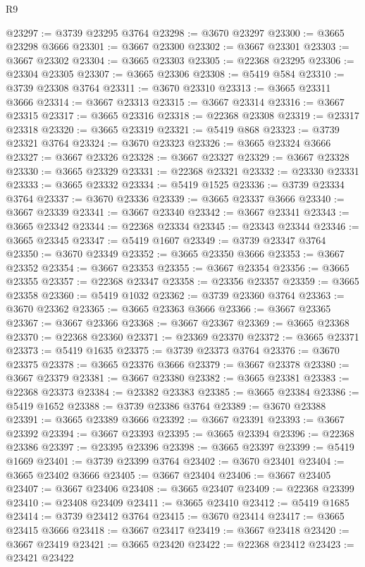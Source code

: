 \begin{lexlean}{R9}
\begin{coremodule}
@23297 := @3739 @23295 @3764
@23298 := @3670 @23297
@23300 := @3665 @23298 @3666
@23301 := @3667 @23300
@23302 := @3667 @23301
@23303 := @3667 @23302
@23304 := @3665 @23303
@23305 := @22368 @23295
@23306 := @23304 @23305
@23307 := @3665 @23306
@23308 := @5419 @584
@23310 := @3739 @23308 @3764
@23311 := @3670 @23310
@23313 := @3665 @23311 @3666
@23314 := @3667 @23313
@23315 := @3667 @23314
@23316 := @3667 @23315
@23317 := @3665 @23316
@23318 := @22368 @23308
@23319 := @23317 @23318
@23320 := @3665 @23319
@23321 := @5419 @868
@23323 := @3739 @23321 @3764
@23324 := @3670 @23323
@23326 := @3665 @23324 @3666
@23327 := @3667 @23326
@23328 := @3667 @23327
@23329 := @3667 @23328
@23330 := @3665 @23329
@23331 := @22368 @23321
@23332 := @23330 @23331
@23333 := @3665 @23332
@23334 := @5419 @1525
@23336 := @3739 @23334 @3764
@23337 := @3670 @23336
@23339 := @3665 @23337 @3666
@23340 := @3667 @23339
@23341 := @3667 @23340
@23342 := @3667 @23341
@23343 := @3665 @23342
@23344 := @22368 @23334
@23345 := @23343 @23344
@23346 := @3665 @23345
@23347 := @5419 @1607
@23349 := @3739 @23347 @3764
@23350 := @3670 @23349
@23352 := @3665 @23350 @3666
@23353 := @3667 @23352
@23354 := @3667 @23353
@23355 := @3667 @23354
@23356 := @3665 @23355
@23357 := @22368 @23347
@23358 := @23356 @23357
@23359 := @3665 @23358
@23360 := @5419 @1032
@23362 := @3739 @23360 @3764
@23363 := @3670 @23362
@23365 := @3665 @23363 @3666
@23366 := @3667 @23365
@23367 := @3667 @23366
@23368 := @3667 @23367
@23369 := @3665 @23368
@23370 := @22368 @23360
@23371 := @23369 @23370
@23372 := @3665 @23371
@23373 := @5419 @1635
@23375 := @3739 @23373 @3764
@23376 := @3670 @23375
@23378 := @3665 @23376 @3666
@23379 := @3667 @23378
@23380 := @3667 @23379
@23381 := @3667 @23380
@23382 := @3665 @23381
@23383 := @22368 @23373
@23384 := @23382 @23383
@23385 := @3665 @23384
@23386 := @5419 @1652
@23388 := @3739 @23386 @3764
@23389 := @3670 @23388
@23391 := @3665 @23389 @3666
@23392 := @3667 @23391
@23393 := @3667 @23392
@23394 := @3667 @23393
@23395 := @3665 @23394
@23396 := @22368 @23386
@23397 := @23395 @23396
@23398 := @3665 @23397
@23399 := @5419 @1669
@23401 := @3739 @23399 @3764
@23402 := @3670 @23401
@23404 := @3665 @23402 @3666
@23405 := @3667 @23404
@23406 := @3667 @23405
@23407 := @3667 @23406
@23408 := @3665 @23407
@23409 := @22368 @23399
@23410 := @23408 @23409
@23411 := @3665 @23410
@23412 := @5419 @1685
@23414 := @3739 @23412 @3764
@23415 := @3670 @23414
@23417 := @3665 @23415 @3666
@23418 := @3667 @23417
@23419 := @3667 @23418
@23420 := @3667 @23419
@23421 := @3665 @23420
@23422 := @22368 @23412
@23423 := @23421 @23422

\end{coremodule}
\end{lexlean}
